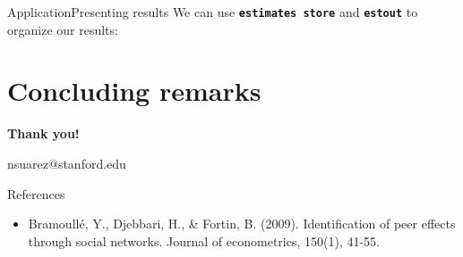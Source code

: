 \documentclass[aspectratio=169]{beamer}
\begin{document}
\begin{frame}{Application}{Presenting results}
We can use \textbf{\texttt{estimates store}} and \textbf{\texttt{estout}} to organize our results:\\
\vspace{0.37cm}
\centering
{}
\end{frame}


\section{Concluding remarks}



\begin{frame}
  \begin{center}
  \Huge \textbf{Thank you!}
  \end{center}


  nsuarez@stanford.edu
\end{frame}



\appendix


\begin{frame}{References}
\begin{itemize}
\item Bramoullé, Y., Djebbari, H., \& Fortin, B. (2009). Identification of peer effects through social networks. Journal of econometrics, 150(1), 41-55.
\end{itemize}
\end{frame}
\end{document}

